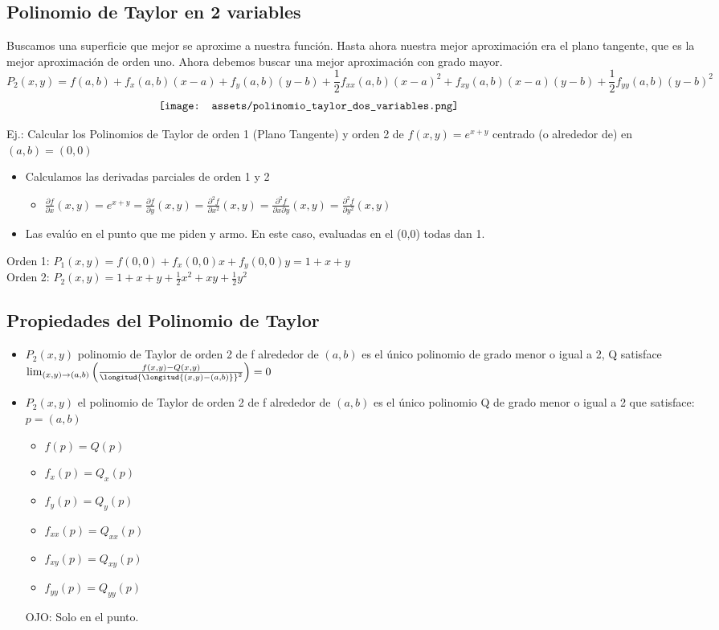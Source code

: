 \documentclass[10pt,a4paper]{article}
\begin{document}
\subsection*{Polinomio de Taylor en 2 variables}
Buscamos una superficie que mejor se aproxime a nuestra función. Hasta ahora nuestra mejor aproximación era el plano tangente, que es la mejor aproximación de orden uno. Ahora debemos buscar una mejor aproximación con grado mayor. 
\[P_{2}(x,y) = f(a, b) + f_{x}(a, b)(x-a) + f_{y}(a, b)(y-b) + \frac{1}{2}f_{xx}(a,b)(x-a)^{2} + f_{xy}(a,b)(x-a)(y-b)+\frac{1}{2}f_{yy}(a,b)(y-b)^{2}\]
\[\begin{minipage}[b]{1\textwidth}
    \texttt{[image: assets/polinomio\_taylor\_dos\_variables.png]}
\end{minipage}\]

Ej.: Calcular los Polinomios de Taylor de orden 1 (Plano Tangente) y orden 2 de $f(x,y) = e^{x+y}$ centrado (o alrededor de) en $(a,b) = (0,0)$
\begin{itemize}
    \item Calculamos las derivadas parciales de orden 1 y 2
    \begin{itemize}
        \item $\frac{\partial f}{\partial x}(x,y) = e^{x+y} = \frac{\partial f}{\partial y}(x,y) = \frac{\partial^{2}f}{\partial x^{2}}(x,y) = \frac{\partial^{2}f}{\partial x \partial y}(x,y) = \frac{\partial^{2}f}{\partial y^{2}}(x,y) $
    \end{itemize}
    \item Las evalúo en el punto que me piden y armo. En este caso, evaluadas en el (0,0) todas dan 1.
\end{itemize}
Orden 1: $P_{1}(x,y) = f(0,0) + f_{x}(0,0)x + f_{y}(0, 0)y = 1 + x + y$ \\
Orden 2: $P_{2}(x,y) = 1 + x + y + \frac{1}{2}x^{2} + xy + \frac{1}{2}y^{2}$
\subsection*{Propiedades del Polinomio de Taylor}
\begin{itemize}
    \item $P_{2}(x,y)$ polinomio de Taylor de orden 2 de f alrededor de $(a,b)$ es el único polinomio de grado menor o igual a 2, Q satisface $\lim_{(x,y) \to (a,b)} \left(\frac{f(x,y) - Q(x,y)}{\longitud{\longitud{(x,y) - (a,b)}}^{2}}  \right) = 0$
    \item $P_{2}(x,y)$ el polinomio de Taylor de orden 2 de f alrededor de $(a,b)$ es el único polinomio Q de grado menor o igual a 2 que satisface: $p = (a,b)$
    \begin{itemize}
        \item $f(p) = Q(p)$
        \item $f_{x}(p) = Q_{x}(p)$
        \item $f_{y}(p) = Q_{y}(p)$
        \item $f_{xx}(p) = Q_{xx}(p)$
        \item $f_{xy}(p) = Q_{xy}(p)$
        \item $f_{yy}(p) = Q_{yy}(p)$
    \end{itemize}
    OJO: Solo en el punto.
\end{itemize}
\end{document}
